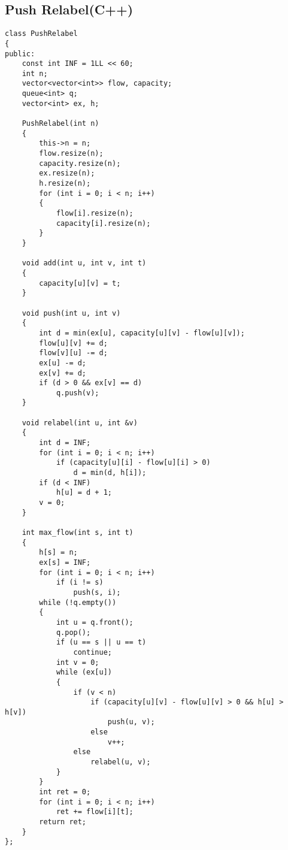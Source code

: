 \documentclass[landscape, 8pt, a4paper, oneside, twocolumn]{extarticle}
\begin{document}
\subsection{Push Relabel(C++)}
\begin{verbatim}
class PushRelabel
{
public:
    const int INF = 1LL << 60;
    int n;
    vector<vector<int>> flow, capacity;
    queue<int> q;
    vector<int> ex, h;

    PushRelabel(int n)
    {
        this->n = n;
        flow.resize(n);
        capacity.resize(n);
        ex.resize(n);
        h.resize(n);
        for (int i = 0; i < n; i++)
        {
            flow[i].resize(n);
            capacity[i].resize(n);
        }
    }

    void add(int u, int v, int t)
    {
        capacity[u][v] = t;
    }

    void push(int u, int v)
    {
        int d = min(ex[u], capacity[u][v] - flow[u][v]);
        flow[u][v] += d;
        flow[v][u] -= d;
        ex[u] -= d;
        ex[v] += d;
        if (d > 0 && ex[v] == d)
            q.push(v);
    }

    void relabel(int u, int &v)
    {
        int d = INF;
        for (int i = 0; i < n; i++)
            if (capacity[u][i] - flow[u][i] > 0)
                d = min(d, h[i]);
        if (d < INF)
            h[u] = d + 1;
        v = 0;
    }

    int max_flow(int s, int t)
    {
        h[s] = n;
        ex[s] = INF;
        for (int i = 0; i < n; i++)
            if (i != s)
                push(s, i);
        while (!q.empty())
        {
            int u = q.front();
            q.pop();
            if (u == s || u == t)
                continue;
            int v = 0;
            while (ex[u])
            {
                if (v < n)
                    if (capacity[u][v] - flow[u][v] > 0 && h[u] > h[v])
                        push(u, v);
                    else
                        v++;
                else
                    relabel(u, v);
            }
        }
        int ret = 0;
        for (int i = 0; i < n; i++)
            ret += flow[i][t];
        return ret;
    }
};
\end{verbatim}
\end{document}
